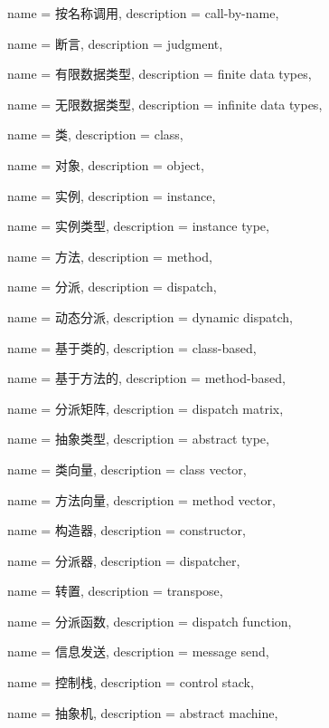 {
	name = 按名称调用,
	description = {call-by-name},
}

{
	name = 断言,
	description = {judgment},
}

{
	name = 有限数据类型,
	description = {finite data types},
}


{
	name = 无限数据类型,
	description = {infinite data types},
}

{
    name = 类,
    description = {class},
}

{
    name = 对象,
    description = {object},
}

{
    name = 实例,
    description = {instance},
}

{
    name = 实例类型,
    description = {instance type},
}

{
    name = 方法,
    description = {method},
}

{
    name = 分派,
    description = {dispatch},
}

{
    name = 动态分派,
    description = {dynamic dispatch},
}

{
    name = 基于类的,
    description = {class-based},
}

{
    name = 基于方法的,
    description = {method-based},
}

{
    name = 分派矩阵,
    description = {dispatch matrix},
}

{
    name = 抽象类型,
    description = {abstract type},
}

{
    name = 类向量,
    description = {class vector},
}

{
    name = 方法向量,
    description = {method vector},
}

{
    name = 构造器,
    description = {constructor},
}

{
    name = 分派器,
    description = {dispatcher},
}

{
    name = 转置,
    description = {transpose},
}

{
    name = 分派函数,
    description = {dispatch function},
}

{
    name = 信息发送,
    description = {message send},
}

{
    name = 控制栈,
    description = {control stack},
}

{
    name = 抽象机,
    description = {abstract machine},
}




